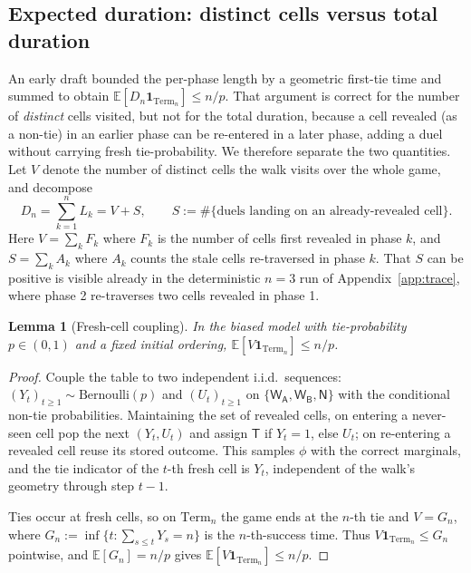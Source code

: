 \documentclass[11pt]{article}
\newtheorem{lemma}{Lemma}
\theoremstyle{definition}
\theoremstyle{remark}
\newcommand{\WA}{\mathsf{W_A}}
\newcommand{\WB}{\mathsf{W_B}}
\newcommand{\TT}{\mathsf{T}}
\newcommand{\NN}{\mathsf{N}}
\newcommand{\Term}{\mathrm{Term}}
\newcommand{\E}{\mathbb{E}}
\begin{document}
\subsection{Expected duration: distinct cells versus total duration}
An early draft bounded the per-phase length by a geometric first-tie time and summed to obtain
$\E[D_n \mathbf 1_{\Term_n}] \le n/p$. That argument is correct for the number of \emph{distinct} cells visited, but not
for the total duration, because a cell revealed (as a non-tie) in an earlier phase can be re-entered in a later phase,
adding a duel without carrying fresh tie-probability. We therefore separate the two quantities. Let $V$ denote the number
of distinct cells the walk visits over the whole game, and decompose
\begin{equation}\label{eq:decomp}
D_n = \sum_{k=1}^n L_k = V + S, \qquad S := \#\{\text{duels landing on an already-revealed cell}\}.
\end{equation}
Here $V = \sum_k F_k$ where $F_k$ is the number of cells first revealed in phase $k$, and $S = \sum_k A_k$ where $A_k$
counts the stale cells re-traversed in phase $k$. That $S$ can be positive is visible already in the deterministic $n = 3$
run of Appendix~\ref{app:trace}, where phase 2 re-traverses two cells revealed in phase 1.

\begin{lemma}[Fresh-cell coupling]\label{lem:fresh}
In the biased model with tie-probability $p \in (0, 1)$ and a fixed initial ordering, $\E[V \mathbf 1_{\Term_n}] \le n/p$.
\end{lemma}
\begin{proof}
Couple the table to two independent i.i.d.\ sequences: $(Y_t)_{t\ge1} \sim \mathrm{Bernoulli}(p)$ and $(U_t)_{t\ge1}$ on
$\{\WA, \WB, \NN\}$ with the conditional non-tie probabilities. Maintaining the set of revealed cells, on entering a
never-seen cell pop the next $(Y_t, U_t)$ and assign $\TT$ if $Y_t = 1$, else $U_t$; on re-entering a revealed cell reuse
its stored outcome. This samples $\phi$ with the correct marginals, and the tie indicator of the $t$-th fresh cell is
$Y_t$, independent of the walk's geometry through step $t - 1$.

Ties occur at fresh cells, so on $\Term_n$ the game ends at the $n$-th tie and $V = G_n$, where
$G_n := \inf\{t : \sum_{s \le t} Y_s = n\}$ is the $n$-th-success time. Thus $V \mathbf 1_{\Term_n} \le G_n$ pointwise,
and $\E[G_n] = n/p$ gives $\E[V \mathbf 1_{\Term_n}] \le n/p$.
\end{proof}
\end{document}
